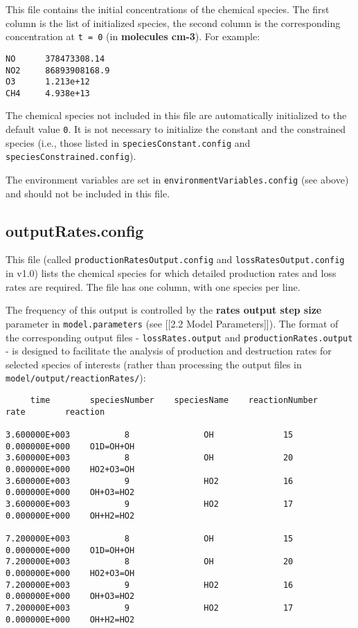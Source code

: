 This file contains the initial concentrations of the chemical species.
The first column is the list of initialized species, the second column
is the corresponding concentration at \texttt{t\ =\ 0} (in
\textbf{molecules cm-3}). For example:

\begin{verbatim}
NO      378473308.14
NO2     86893908168.9
O3      1.213e+12
CH4     4.938e+13
\end{verbatim}

The chemical species not included in this file are automatically
initialized to the default value \texttt{0}. It is not necessary to
initialize the constant and the constrained species (i.e., those listed
in \texttt{speciesConstant.config} and
\texttt{speciesConstrained.config}).

The environment variables are set in
\texttt{environmentVariables.config} (see above) and should not be
included in this file.

\hypertarget{outputrates.config}{%
\subsection{outputRates.config}\label{outputrates.config}}

This file (called \texttt{productionRatesOutput.config} and
\texttt{lossRatesOutput.config} in v1.0) lists the chemical species for
which detailed production rates and loss rates are required. The file
has one column, with one species per line.

The frequency of this output is controlled by the \textbf{rates output
step size} parameter in \texttt{model.parameters} (see {[}{[}2.2 Model
Parameters{]}{]}). The format of the corresponding output files -
\texttt{lossRates.output} and \texttt{productionRates.output} - is
designed to facilitate the analysis of production and destruction rates
for selected species of interests (rather than processing the output
files in \texttt{model/output/reactionRates/}):

\begin{verbatim}
     time        speciesNumber    speciesName    reactionNumber         rate        reaction

3.600000E+003           8               OH              15         0.000000E+000    O1D=OH+OH
3.600000E+003           8               OH              20         0.000000E+000    HO2+O3=OH
3.600000E+003           9               HO2             16         0.000000E+000    OH+O3=HO2
3.600000E+003           9               HO2             17         0.000000E+000    OH+H2=HO2

7.200000E+003           8               OH              15         0.000000E+000    O1D=OH+OH
7.200000E+003           8               OH              20         0.000000E+000    HO2+O3=OH
7.200000E+003           9               HO2             16         0.000000E+000    OH+O3=HO2
7.200000E+003           9               HO2             17         0.000000E+000    OH+H2=HO2
\end{verbatim}

